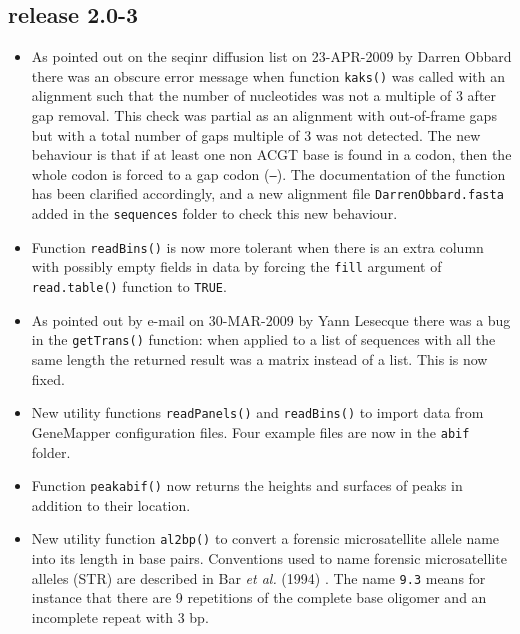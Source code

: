 \documentclass{article}
\begin{document}
\subsection*{release 2.0-3}

\begin{itemize}

\item As pointed out on the seqinr diffusion list on 23-APR-2009
by Darren Obbard there was an obscure error message when function
\texttt{kaks()} was called with an alignment such that the number
of nucleotides was not a multiple of 3 after gap removal. This check
was partial as an alignment with out-of-frame gaps but with
a total number of gaps multiple of 3 was not detected.
The new behaviour is that if at least one non ACGT base is found in a
codon, then the whole codon is forced to a gap codon (\texttt{---}).
The documentation of the function has been clarified accordingly,
and a new alignment file \texttt{DarrenObbard.fasta} added in
the \texttt{sequences} folder to check this new behaviour.

\item Function \texttt{readBins()} is now more tolerant when there
is an extra column with possibly empty fields in data by forcing
the \texttt{fill} argument of \texttt{read.table()} function to
\texttt{TRUE}.

\item As pointed out by e-mail on 30-MAR-2009 by Yann Lesecque there 
was a bug in the \texttt{getTrans()} function: when applied to a 
list of sequences with all the same length the returned result 
was a matrix instead of a list. This is now fixed.

\item New utility functions \texttt{readPanels()} and \texttt{readBins()} 
to import data from GeneMapper configuration files. Four example files
are now in the \texttt{abif} folder.

\item Function \texttt{peakabif()} now returns the heights and
surfaces of peaks in addition to their location.

\item New utility function \texttt{al2bp()} to convert
a forensic microsatellite allele name into its length in base pairs.
Conventions used to name forensic microsatellite alleles (STR) are described
in Bar \emph{et al.} (1994) \cite{BarW1994}. 
The name \texttt{9.3} means for instance that there are
9 repetitions of the complete base oligomer and an incomplete 
repeat with 3 bp.

\end{itemize}
\end{document}
